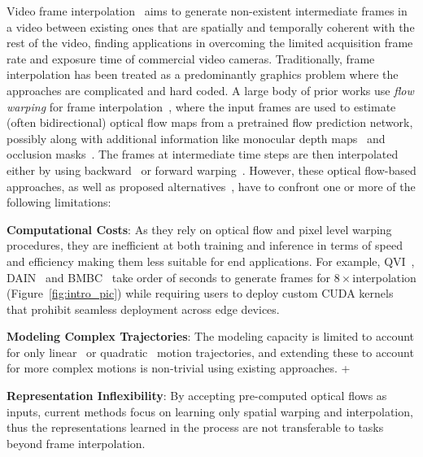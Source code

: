 \documentclass[10pt,twocolumn,letterpaper]{article}
\newcommand{\figref}[1]{Figure~\ref{#1}}
\newcommand{\red}[1]{{#1}}
\newcommand{\eightx}{$8\times$}
\begin{document}
Video frame interpolation~\cite{meyer2018phasenet, bao2019depth, xue2019video, lee2020adacof, jiang2018super, niklaus2017video, niklaus2018context, liu2017video, choi2020channel, niklaus2020softmax} aims to generate non-existent intermediate frames in a video between existing ones that are spatially and temporally coherent with the rest of the video, finding applications in overcoming the limited acquisition frame rate and exposure time of commercial video cameras.
Traditionally, frame interpolation has been treated as a predominantly graphics problem where the approaches are complicated and hard coded. A large body of prior works use \textit{flow warping} for frame interpolation~\cite{jiang2018super, xue2019video, niklaus2020softmax}, where the input frames are used to estimate (often bidirectional) optical flow maps from a pretrained flow prediction network, possibly along with additional information like monocular depth maps~\cite{bao2019depth} and occlusion masks~\cite{bao2019memc}. The frames at intermediate time steps are then interpolated either by using backward~\cite{jiang2018super, bao2019depth} or forward warping~\cite{niklaus2018context, niklaus2020softmax}. However, these optical flow-based approaches, as well as proposed alternatives~\cite{niklaus2017video, niklaus2017video_2, peleg2019net, cheng2020video, lee2020adacof}, have to confront one or more of the following limitations:
\begin{enumerate*}
    \item{\bf Computational Costs}: As they rely on optical flow and pixel level warping procedures, they are inefficient at both training and inference in terms of speed and efficiency making them less suitable for end applications. \red{For example, QVI~\cite{xu2019quadratic}, DAIN~\cite{bao2019depth} and BMBC~\cite{park2020bmbc} take order of seconds to generate frames for \eightx interpolation (\figref{fig:intro_pic}) while requiring users to deploy custom CUDA kernels that prohibit seamless deployment across edge devices.}
    
    \item{\bf Modeling Complex Trajectories}: The modeling capacity is limited to account for only linear~\cite{jiang2018super, bao2019depth} or quadratic~\cite{xu2019quadratic, chi2020all} motion trajectories, and extending these to account for more complex motions is non-trivial using existing approaches. 
    +
    \item{\bf Representation Inflexibility}: By accepting pre-computed optical flows as inputs, current methods focus on learning only spatial warping and interpolation, thus the representations learned in the process are not transferable to tasks beyond frame interpolation. 

\end{enumerate*}
\end{document}
